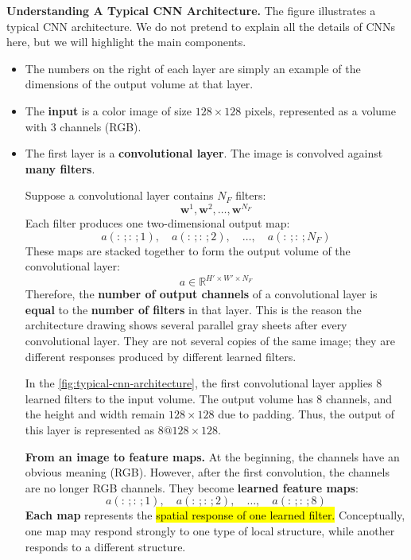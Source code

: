 \highspace
\textcolor{Green3}{ \textbf{Understanding A Typical CNN Architecture.}} The figure illustrates a typical CNN architecture. We do not pretend to explain all the details of CNNs here, but we will highlight the main components.
\begin{itemize}
    \item The numbers on the right of each layer are simply an example of the dimensions of the output volume at that layer.
    
    
    \item The \textbf{input} is a color image of size $128\times128$ pixels, represented as a volume with 3 channels (RGB).
    
    
    \item The first layer is a \textbf{convolutional layer}. The image is convolved against \textbf{many filters}.
    
    \highspace
    Suppose a convolutional layer contains $N_F$ filters:
    \begin{equation*}
        \mathbf{w}^1, \mathbf{w}^2, \ldots, \mathbf{w}^{N_F}
    \end{equation*}
    Each filter produces one two-dimensional output map:
    \begin{equation*}
        a(:\,; :\,; 1), \quad a(:\,; :\,; 2), \quad \ldots, \quad a(:\,; :\,; N_F)
    \end{equation*}
    These maps are stacked together to form the output volume of the convolutional layer:
    \begin{equation*}
        a \in \mathbb{R}^{H' \times W' \times N_F}
    \end{equation*}
    Therefore, the \textbf{number of output channels} of a convolutional layer is \textbf{equal} to the \textbf{number of filters} in that layer. This is the reason the architecture drawing shows several parallel gray sheets after every convolutional layer. They are not several copies of the same image; they are different responses produced by different learned filters.
    
    \highspace
    In the \autoref{fig:typical-cnn-architecture}, the first convolutional layer applies 8 learned filters to the input volume. The output volume has 8 channels, and the height and width remain $128\times128$ due to padding. Thus, the output of this layer is represented as $8@128\times128$.

    \highspace
    \textcolor{Green3}{ \textbf{From an image to feature maps.}} At the beginning, the channels have an obvious meaning (RGB). However, after the first convolution, the channels are no longer RGB channels. They become \textbf{learned feature maps}:
    \begin{equation*}
        a(:\,; :\,; 1), \quad a(:\,; :\,; 2), \quad \ldots, \quad a(:\,; :\,; 8)
    \end{equation*}
    \textbf{Each map} represents the \hl{spatial response of one learned filter.} Conceptually, one map may respond strongly to one type of local structure, while another responds to a different structure.


\end{itemize}
